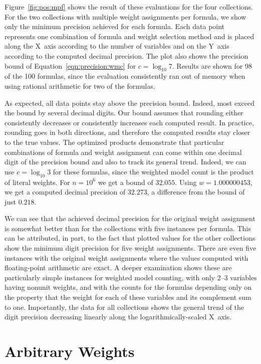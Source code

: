 \documentclass[
hf
]{ceurart}
\begin{document}
Figure~\ref{fig:pos:mpf} shows the result of these evaluations for
the four collections.  For the two collections with multiple weight assignments per formula,
we show only the minimum precision achieved for each formula.
Each data point
represents one combination of formula and weight selection method and is placed
along the X~axis according to the number of variables
and on the Y~axis according to the computed decimal precision.
The plot also shows the precision bound of Equation~\ref{eqn:precision:wmc} for $c=\log_{10} 7$.
Results are shown for 98 of the 100 formulas, since the evaluation consistently ran out of memory when using rational arithmetic for two of the formulas.

As  expected, all data points stay above the precision bound.
Indeed, most exceed the bound by several decimal digits.  Our bound
assumes that rounding either consistently decreases or consistently
increases each computed result.  In practice, rounding goes in both
directions, and therefore the computed results stay closer to the true
values.  The optimized products demonstrate that particular
combinations of formula and weight assignment can come within one
decimal digit of the precision bound and also to track its general
trend.  Indeed, we can use $c = \log_{10} 3$ for these formulas,
since the weighted model count is the product of literal weights.
For $n=10^6$ we get a bound of $32.055$.
Using $w=1.000000453$, we get
a computed decimal precision of $32.273$, a difference from the bound of just $0.218$.

We can see that the achieved decimal precision for the original weight
assignment is somewhat better than for the collections with five
instances per formula.  This can be attributed, in part, to the fact
that plotted values for the other collections show the minimum digit
precision for five weight assignments.  There are even five instances
with the original weight assignments where the values computed with
floating-point arithmetic are exact.  A deeper examination shows these
are particularly simple instances for weighted model counting, with
only 2--3 variables having nonunit weights, and with the counts for
the formulas depending only on the property that the weight for each
of these variables and its complement sum to one.  Importantly, the
data for all collections shows the general trend of the digit
precision decreasing linearly along the logarithmically-scaled X~axis.

\section{Arbitrary Weights}
\label{sect:neg}
\end{document}
